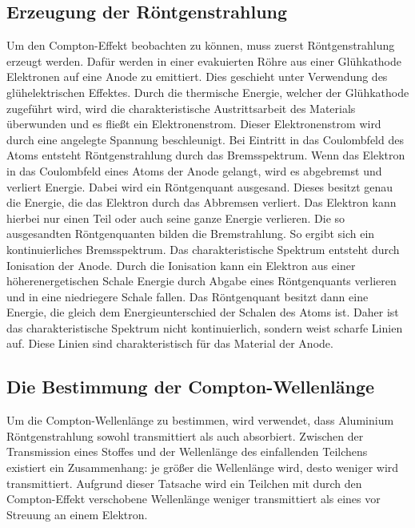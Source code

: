 \subsection{Erzeugung der Röntgenstrahlung}
\label{sec:röntgenstr}
Um den Compton-Effekt beobachten zu können, muss zuerst Röntgenstrahlung erzeugt werden. Dafür werden in einer evakuierten Röhre aus einer Glühkathode Elektronen auf eine Anode zu emittiert. Dies geschieht unter
Verwendung des glühelektrischen Effektes. Durch die thermische Energie, welcher der Glühkathode zugeführt wird,
wird die charakteristische Austrittsarbeit des Materials überwunden und es fließt ein Elektronenstrom.
Dieser Elektronenstrom wird durch eine angelegte Spannung beschleunigt.
Bei Eintritt in das Coulombfeld des Atoms entsteht Röntgenstrahlung durch das Bremsspektrum.
Wenn das Elektron in das Coulombfeld eines Atoms der Anode gelangt, wird es abgebremst und verliert Energie. Dabei wird ein Röntgenquant ausgesand. Dieses besitzt genau die Energie, die das Elektron durch das
Abbremsen verliert. Das Elektron kann hierbei nur einen Teil oder auch seine ganze Energie verlieren.
Die so ausgesandten Röntgenquanten bilden die Bremstrahlung. So ergibt sich ein kontinuierliches Bremsspektrum.
Das charakteristische Spektrum entsteht durch Ionisation der Anode. Durch die Ionisation kann ein Elektron aus einer höherenergetischen Schale Energie durch Abgabe eines Röntgenquants verlieren und in eine
niedriegere Schale fallen. Das Röntgenquant besitzt dann eine Energie, die gleich dem Energieunterschied der Schalen des Atoms ist. Daher ist das charakteristische Spektrum nicht kontinuierlich, sondern weist
scharfe Linien auf. Diese Linien sind charakteristisch für das Material der Anode.

\subsection{Die Bestimmung der Compton-Wellenlänge}
\label{sec:comptonwellenlänge}
Um die Compton-Wellenlänge zu bestimmen, wird verwendet, dass Aluminium Röntgenstrahlung sowohl transmittiert als auch absorbiert.
Zwischen der Transmission eines Stoffes und der Wellenlänge des einfallenden
Teilchens existiert ein Zusammenhang: je größer die Wellenlänge wird, desto weniger wird transmittiert. Aufgrund dieser Tatsache wird ein Teilchen mit durch den Compton-Effekt verschobene Wellenlänge weniger
transmittiert als eines vor Streuung an einem Elektron.

